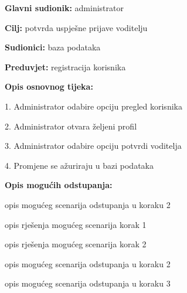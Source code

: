 					\noindent {}
					\begin{packed_item}
						
						\item \textbf{Glavni sudionik: }administrator
						\item  \textbf{Cilj:} potvrda uspješne prijave voditelju
						\item  \textbf{Sudionici:} baza podataka
						\item  \textbf{Preduvjet:} registracija korisnika
						\item  \textbf{Opis osnovnog tijeka:}
						
						\item[] \begin{packed_enum}
							
							\item 1. Administrator odabire opciju pregled korisnika
							\item 2. Administrator otvara željeni profil
							\item 3. Administrator odabire opciju potvrdi voditelja
							\item 4. Promjene se ažuriraju u bazi podataka
						\end{packed_enum}
						
						\item  \textbf{Opis mogućih odstupanja:}
						
						\item[] \begin{packed_item}
							
							\item[2.a] opis mogućeg scenarija odstupanja u koraku 2
							\item[] \begin{packed_enum}
								
								\item opis rješenja mogućeg scenarija korak 1
								\item opis rješenja mogućeg scenarija korak 2
								
							\end{packed_enum}
							\item[2.b] opis mogućeg scenarija odstupanja u koraku 2
							\item[3.a] opis mogućeg scenarija odstupanja  u koraku 3
							
						\end{packed_item}
					\end{packed_item}
					

